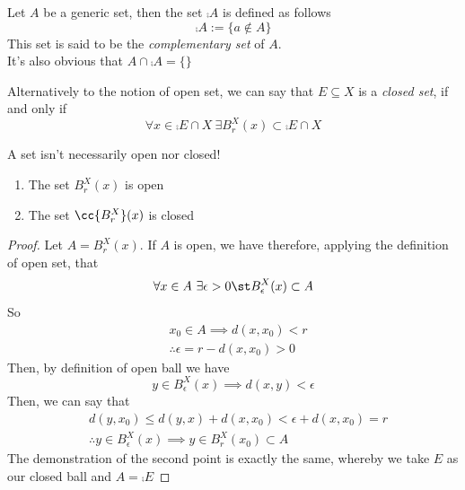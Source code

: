 \documentclass[../mmf.tex]{subfiles}
\begin{document}
\begin{dfn}
	Let $A$ be a generic set, then the set $\comp{A}$ is defined as follows
	\begin{equation}
		\comp{A}:=\{a\notin A\}
		\label{eq:compsetdef}
	\end{equation}
	This set is said to be the \textit{complementary set} of $A$.\\
	It's also obvious that $A\cap\comp{A}=\{\}$
\end{dfn}
\begin{dfn}
	Alternatively to the notion of open set, we can say that $E\subseteq X$ is a \textit{closed set}, if and only if
	\begin{equation}
		\forall x\in\comp{E}\cap X\ \exists B_r^X(x)\subset\comp{E}\cap X
		\label{eq:closedsetdef}
	\end{equation}
\end{dfn}
\begin{rmk}
	A set isn't necessarily open nor closed!
\end{rmk}
\begin{prop}
	\begin{enumerate}
	\item The set $B_r^X(x)$ is open
	\item The set $\cc{B_r^X}(x)$ is closed
	\end{enumerate}
\end{prop}
\begin{proof}
	Let $A=B_r^X(x)$. If $A$ is open, we have therefore, applying the definition of open set, that
	\begin{equation*}
		\forall x\in A\ \exists\epsilon>0\st B^X_\epsilon(x)\subset A
	\end{equation*}
	So
	\begin{equation*}
		\begin{aligned}
			&x_0\in A\implies{} d(x,x_0)<r\\
			&\therefore\epsilon=r-d(x,x_0)>0
		\end{aligned}
	\end{equation*}
	Then, by definition of open ball we have
	\begin{equation*}
		y\in B^X_\epsilon(x)\implies{} d(x,y)<\epsilon
	\end{equation*}
	Then, we can say that
	\begin{equation*}
		\begin{aligned}
			&d(y,x_0)\le d(y,x)+d(x,x_0)<\epsilon+d(x,x_0)=r\\
			&\therefore y\in B^X_\epsilon(x)\implies{} y\in B^X_r(x_0)\subset A
		\end{aligned}
	\end{equation*}
	The demonstration of the second point is exactly the same, whereby we take $E$ as our closed ball and $A=\comp{E}$
\end{proof}
\end{document}
